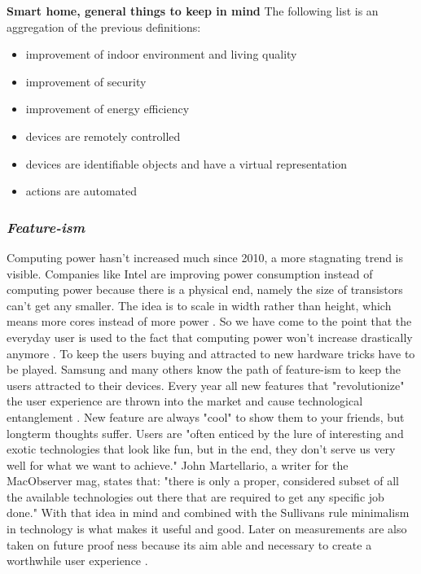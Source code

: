 			\textbf{Smart home, general things to keep in mind}
				The following list is an aggregation of the previous definitions:

				\begin{itemize}
					\item improvement of indoor environment and living quality
					\item improvement of security
					\item improvement of energy efficiency
					\item devices are remotely controlled
					\item devices are identifiable objects and have a virtual representation
					\item actions are automated
				\end{itemize}

		\subsubsection{\textit{Feature-ism}}
			Computing power hasn't increased much since 2010, a more stagnating trend is visible. Companies like Intel are improving power consumption instead of computing power because there is a physical end, namely the size of transistors can't get any smaller. The idea is to scale in width rather than height, which means more cores instead of more power \parencite{CPUComputingPower}. So we have come to the point that the everyday user is used to the fact that computing power won't increase drastically anymore \parencite{CPUComputingPower}. To keep the users buying and attracted to new hardware tricks have to be played. Samsung and many others know the path of feature-ism to keep the users attracted to their devices. Every year all new features that "revolutionize" the user experience are thrown into the market and cause technological entanglement \parencite{TechnologicalMinimalism}. New feature are always "cool" to show them to your friends, but longterm thoughts suffer. Users are "often enticed by the lure of interesting and exotic technologies that look like fun, but in the end, they don't serve us very well for what we want to achieve."\parencite{TechnologicalMinimalism} John Martellario, a writer for the MacObserver mag, states that: "there is only a proper, considered subset of all the available technologies out there that are required to get any specific job done." \parencite{TechnologicalMinimalism} With that idea in mind and combined with the Sullivans rule minimalism in technology is what makes it useful and good. Later on measurements are also taken on future proof ness because its aim able and necessary to create a worthwhile user experience \parencite{TechnologicalMinimalism}. 

